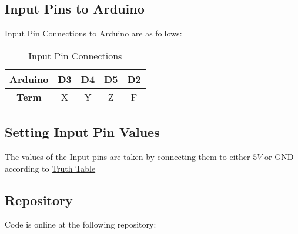 \documentclass[a4paper,11pt]{article}
\newcommand\HSPC{\rule{0pt}{4ex}\rule[-2.0ex]{0pt}{0pt}}
\begin{document}
    \subsection{Input Pins to Arduino} {
        Input Pin Connections to Arduino are as follows:
        \begin{table}[ht]
            \centering
            \begin{tabular}{|c |c |c |c |c |}
            \hline
                \textbf{Arduino} & D3& D4& D5&D2 \HSPC \\
            \hline
                \textbf{Term} & X & Y & Z &F\HSPC \\
            \hline
            \end{tabular}
            \caption{Input Pin Connections}
            \label{tab:cnct_ip}
        \end{table}
    }
    
\subsection{Setting Input Pin Values}
        The values of the Input pins are taken by connecting them to either $5V$ or GND according to \hyperref[sec:ttf]{Truth Table}
\bigskip    




\subsection{Repository}
Code is online at the following repository:
\begin{center}
    \setlength{\fboxsep}{1em}
        
    
\end{center}
\end{document}
